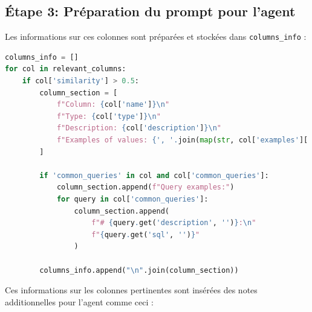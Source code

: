 \documentclass[a4paper,11pt]{article}
\begin{document}
\newpage
\subsection*{Étape 3: Préparation du prompt pour l'agent}

Les informations sur ces colonnes sont préparées et stockées dans \texttt{columns\_info} :

\begin{lstlisting}[language=Python, caption=Préparation des informations sur les colonnes pertinentes]
columns_info = []
for col in relevant_columns:
    if col['similarity'] > 0.5:
        column_section = [
            f"Column: {col['name']}\n"
            f"Type: {col['type']}\n"
            f"Description: {col['description']}\n"
            f"Examples of values: {', '.join(map(str, col['examples'][:3]))}"
        ]
        
        if 'common_queries' in col and col['common_queries']:
            column_section.append(f"Query examples:")
            for query in col['common_queries']:
                column_section.append(
                    f"# {query.get('description', '')}:\n"
                    f"{query.get('sql', '')}"
                )
        
        columns_info.append("\n".join(column_section))
\end{lstlisting}

Ces informations sur les colonnes pertinentes sont insérées des notes additionnelles pour l'agent
comme ceci :
\end{document}

